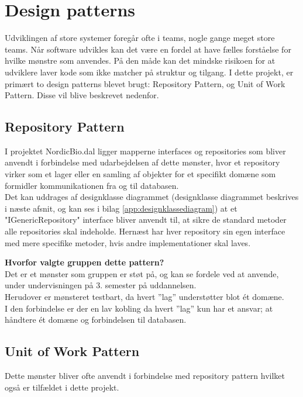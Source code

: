 \section{Design patterns}\label{designpatterns}
Udviklingen af store systemer foregår ofte i teams, nogle gange meget store teams. 
Når software udvikles kan det være en fordel at have fælles forståelse for hvilke mønstre som anvendes. 
På den måde kan det mindske risikoen for at udviklere laver kode som ikke matcher på struktur og tilgang. 
I dette projekt, er primært to design 
patterns blevet brugt: Repository Pattern, og Unit of Work Pattern. Disse vil blive beskrevet nedenfor.

\subsection{Repository Pattern}
I projektet NordicBio.dal ligger mapperne interfaces og repositories som bliver anvendt i forbindelse med udarbejdelsen af 
dette mønster, hvor et repository virker som et lager eller en samling af objekter for et specifikt domæne som formidler 
kommunikationen fra og til databasen. \\

Det kan uddrages af designklasse diagrammet (designklasse diagrammet beskrives i næste afsnit, 
og kan ses i bilag \ref{app:designklassediagram}) at et 
"IGenericRepository" interface bliver anvendt til, 
at sikre de standard metoder alle repositories skal indeholde. 
Hernæst har hver repository sin egen interface med mere specifike metoder, hvis andre implementationer skal laves.

\textbf{Hvorfor valgte gruppen dette pattern?}\\
Det er et mønster som gruppen er støt på, og kan se fordele ved at anvende, under undervisningen på 3. semester på uddannelsen. \\

Herudover er mønsteret testbart, da hvert ”lag” understøtter blot ét domæne. \\

I den forbindelse er der en lav kobling da hvert ”lag” kun har et ansvar; at håndtere ét domæne og forbindelsen til databasen.

\subsection{Unit of Work Pattern}
Dette mønster bliver ofte anvendt i forbindelse med repository pattern hvilket også er tilfældet i dette projekt. \\

